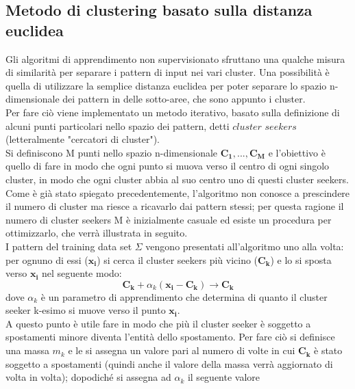 \newpage

\subsection{Metodo di clustering basato sulla distanza euclidea}
\label{metodo distanza euclidea}
Gli algoritmi di apprendimento non supervisionato sfruttano una qualche misura di similarità per separare i pattern di input nei vari cluster. Una possibilità è quella di utilizzare la semplice distanza euclidea per poter separare lo spazio n-dimensionale dei pattern in delle sotto-aree, che sono appunto i cluster. \\
Per fare ciò viene implementato un metodo iterativo, basato sulla definizione di alcuni punti particolari nello spazio dei pattern, detti $\textit{cluster seekers}$ (letteralmente "cercatori di cluster"). \\
Si definiscono M punti nello spazio n-dimensionale $\textbf{C}_\textbf{1},...,\textbf{C}_\textbf{M}$ e l'obiettivo è quello di fare in modo che ogni punto si muova verso il centro di ogni singolo cluster, in modo che ogni cluster abbia al suo centro uno di questi cluster seekers. \\
Come è già stato spiegato precedentemente, l'algoritmo non conosce a prescindere il numero di cluster ma riesce a ricavarlo dai pattern stessi; per questa ragione il numero di cluster seekers M è inizialmente casuale ed esiste un procedura per ottimizzarlo, che verrà illustrata in seguito. \\
I pattern del training data set $\Sigma$ vengono presentati all'algoritmo uno alla volta: per ognuno di essi ($\textbf{x}_\textbf{i}$) si cerca il cluster seekers più vicino ($\textbf{C}_\textbf{k}$) e lo si sposta verso $\textbf{x}_\textbf{i}$ nel seguente modo:
\begin{equation}
\textbf{C}_\textbf{k} + \alpha_k(\textbf{x}_\textbf{i} - \textbf{C}_\textbf{k}) \rightarrow \textbf{C}_\textbf{k}
\end{equation}
dove $\alpha_k$ è un parametro di apprendimento che determina di quanto il cluster seeker k-esimo si muove verso il punto $\textbf{x}_\textbf{i}$. \\
A questo punto è utile fare in modo che più il cluster seeker è soggetto a spostamenti minore diventa l'entità dello spostamento. Per fare ciò si definisce una massa $m_k$ e le si assegna un valore pari al numero di volte in cui $\textbf{C}_\textbf{k}$ è stato soggetto a spostamenti (quindi anche il valore della massa verrà aggiornato di volta in volta); dopodiché si assegna ad $\alpha_k$ il seguente valore
